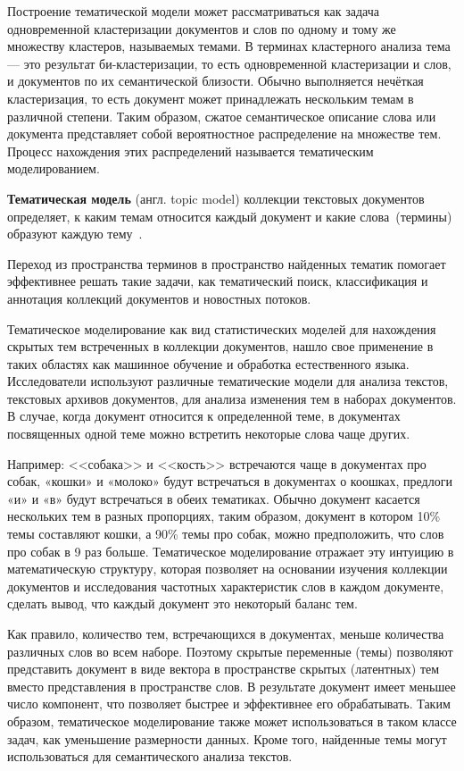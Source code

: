 Построение тематической модели может рассматриваться как задача одновременной кластеризации документов и слов по одному и тому же множеству кластеров, называемых темами. В терминах кластерного анализа тема — это результат би-кластеризации, то есть одновременной кластеризации и слов, и документов по их семантической близости. Обычно выполняется нечёткая кластеризация, то есть документ может принадлежать нескольким темам в различной степени. Таким образом, сжатое семантическое описание слова или документа представляет собой вероятностное распределение на множестве тем. Процесс нахождения этих распределений называется тематическим моделированием. 

\textbf{Тематическая модель} (англ. topic model) коллекции текстовых документов определяет, к каким темам относится каждый документ и какие слова~(термины) образуют каждую тему~\cite{ML_PTM}. 

Переход из пространства терминов в пространство найденных тематик помогает эффективнее решать такие задачи, как тематический поиск, классификация и аннотация коллекций документов и новостных потоков.

Тематическое моделирование как вид статистических моделей для нахождения скрытых тем встреченных в коллекции документов, нашло свое применение в таких областях как машинное обучение и обработка естественного языка. Исследователи используют различные тематические модели для анализа текстов, текстовых архивов документов, для анализа изменения тем в наборах документов. В случае, когда документ относится к определенной теме, в документах посвященных одной теме можно встретить некоторые слова чаще других. 

Например: <<собака>> и <<кость>> встречаются чаще в документах про собак, «кошки» и «молоко» будут встречаться в документах о коошках, предлоги «и» и «в» будут встречаться в обеих тематиках. Обычно документ касается нескольких тем в разных пропорциях, таким образом, документ в котором 10\% темы составляют кошки, а 90\% темы про собак, можно предположить, что слов про собак в 9 раз больше. Тематическое моделирование отражает эту интуицию в математическую структуру, которая позволяет на основании изучения коллекции документов и исследования частотных характеристик слов в каждом документе, сделать вывод, что каждый документ это некоторый баланс тем.

Как правило, количество тем, встречающихся в документах, меньше количества различных слов во всем наборе. Поэтому скрытые переменные (темы) позволяют представить документ в виде вектора в пространстве скрытых (латентных) тем вместо представления в пространстве слов. В результате документ имеет меньшее число компонент, что позволяет быстрее и эффективнее его обрабатывать. Таким образом, тематическое моделирование также может использоваться в таком классе задач, как уменьшение размерности данных. Кроме того, найденные темы могут использоваться для семантического анализа текстов. 

